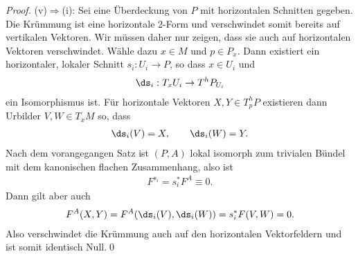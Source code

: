 \documentclass[%
	paper=a5,%
	fleqn,%
	DIV=18,%
	BCOR=0mm,
	fontsize=11pt,
	titlepage=false,%
	bibliography=totoc,
	DIV=18,%
	twoside=true,
	pdftitle=Riemannsche Geometrie,
	pdfauthor=Uwe Semmelmann,
	numbers=noendperiod]%
	{scrbook}
\begin{document}
\begin{proof}
(v)$\Rightarrow$(i): Sei eine Überdeckung von $P$ mit horizontalen Schnitten gegeben.
Die Krümmung ist eine horizontale 2-Form und verschwindet somit bereits auf
vertikalen Vektoren. Wir müssen daher nur zeigen, dass sie auch auf horizontalen
Vektoren verschwindet. Wähle dazu $x\in M$ und $p\in P_x$. Dann existiert ein
horizontaler, lokaler Schnitt $s_i : U_i\to P$, so dass $x\in U_i$ und
\begin{align*}
\ds_i : T_x U_i\to T^hP_{U_i}
\end{align*}
ein Isomorphismus ist. Für horizontale Vektoren $X,Y\in T_p^hP$ existieren
dann Urbilder $V,W\in T_xM$ so, dass
\begin{align*}
\ds_i(V) = X,\qquad \ds_i(W) = Y.
\end{align*}
Nach dem vorangegangen Satz ist $(P,A)$ lokal isomorph zum trivialen Bündel mit
dem kanonischen flachen Zusammenhang, also ist
\begin{align*}
F^{s_i} = s_i^* F^A \equiv 0.
\end{align*}
Dann gilt aber auch
\begin{align*}
F^A(X,Y) = F^A(\ds_i(V),\ds_i(W)) = s_i^*F(V,W) = 0.
\end{align*}
Also verschwindet die Krümmung auch auf den horizontalen Vektorfeldern und ist
somit identisch Null.\qed
\end{proof}
\end{document}
